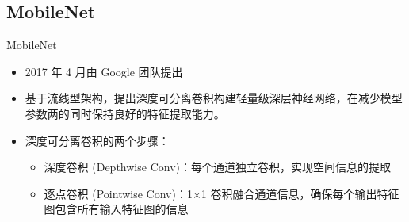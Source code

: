 \documentclass{beamer}
\begin{document}
\subsection{MobileNet}
\begin{frame}{MobileNet}

    \begin{itemize}
        \item 2017 年 4 月由 Google 团队提出
        \item 基于流线型架构，提出深度可分离卷积构建轻量级深层神经网络，在减少模型参数两的同时保持良好的特征提取能力。
        \item 深度可分离卷积的两个步骤：
        \begin{itemize}
            \item 深度卷积 (Depthwise Conv)：每个通道独立卷积，实现空间信息的提取
            \item 逐点卷积 (Pointwise Conv)：1$\times$1 卷积融合通道信息，确保每个输出特征图包含所有输入特征图的信息
        \end{itemize}
    \end{itemize}


\end{frame}
\end{document}
